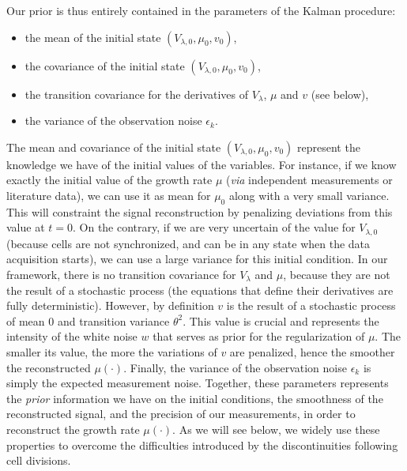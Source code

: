 Our prior is thus entirely contained in the parameters of the Kalman procedure:
\begin{itemize}
\item the mean of the initial state $(V_{\lambda,0}, \mu_0, v_0)$,
\item the covariance of the initial state $(V_{\lambda,0}, \mu_0, v_0)$,
\item the transition covariance for the derivatives of $V_\lambda$, $\mu$ and $v$ (see below),
\item the variance of the observation noise $\epsilon_k$.
\end{itemize}
The mean and covariance of the initial state $(V_{\lambda,0}, \mu_0, v_0)$ represent the knowledge we have of the initial values of the variables.
For instance, if we know exactly the initial value of the growth rate $\mu$ (\textit{via} independent measurements or literature data), we can use it as mean for $\mu_0$ along with a very small variance.
This will constraint the signal reconstruction by penalizing deviations from this value at $t=0$.
On the contrary, if we are very uncertain of the value for $V_{\lambda,0}$ (because cells are not synchronized, and can be in any state when the data acquisition starts), we can use a large variance for this initial condition.
In our framework, there is no transition covariance for $V_\lambda$ and $\mu$, because they are not the result of a stochastic process (the equations that define their derivatives are fully deterministic).
However, by definition $v$ is the result of a stochastic process of mean 0 and transition variance $\theta^2$.
This value is crucial and represents the intensity of the white noise $w$ that serves as prior for the regularization of $\mu$.
The smaller its value, the more the variations of $v$ are penalized, hence the smoother the reconstructed $\mu (\cdot)$.
Finally, the variance of the observation noise $\epsilon_k$ is simply the expected measurement noise.
Together, these parameters represents the \textit{prior} information we have on the initial conditions, the smoothness of the reconstructed signal, and the precision of our measurements, in order to reconstruct the growth rate $\mu (\cdot)$.
As we will see below, we widely use these properties to overcome the difficulties introduced by the discontinuities following cell divisions.

